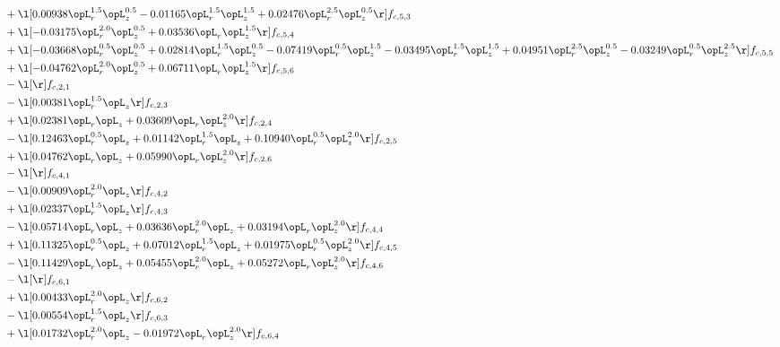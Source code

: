 \begin{alignat}{2}
& + \l[  0.00938 \opL_r^{1.5} \opL_z^{0.5}   -0.01165 \opL_r^{1.5} \opL_z^{1.5} +  0.02476 \opL_r^{2.5} \opL_z^{0.5}  \r] f_{c,5,3} \nonumber \\ 
& + \l[  -0.03175 \opL_r^{2.0} \opL_z^{0.5} +  0.03536 \opL_r \opL_z^{1.5}  \r] f_{c,5,4} \nonumber \\ 
& + \l[  -0.03668 \opL_r^{0.5} \opL_z^{0.5} +  0.02814 \opL_r^{1.5} \opL_z^{0.5}   -0.07419 \opL_r^{0.5} \opL_z^{1.5}   -0.03495 \opL_r^{1.5} \opL_z^{1.5} +  0.04951 \opL_r^{2.5} \opL_z^{0.5}   -0.03249 \opL_r^{0.5} \opL_z^{2.5}  \r] f_{c,5,5} \nonumber \\ 
& + \l[  -0.04762 \opL_r^{2.0} \opL_z^{0.5} +  0.06711 \opL_r \opL_z^{1.5}  \r] f_{c,5,6} \nonumber \\ 
& - \l[  \r] f_{c,2,1} \nonumber \\ 
& - \l[  0.00381 \opL_r^{1.5} \opL_z  \r] f_{c,2,3} \nonumber \\ 
& + \l[  0.02381 \opL_r \opL_z +  0.03609 \opL_r \opL_z^{2.0}  \r] f_{c,2,4} \nonumber \\ 
& - \l[  0.12463 \opL_r^{0.5} \opL_z +  0.01142 \opL_r^{1.5} \opL_z +  0.10940 \opL_r^{0.5} \opL_z^{2.0}  \r] f_{c,2,5} \nonumber \\ 
& + \l[  0.04762 \opL_r \opL_z +  0.05990 \opL_r \opL_z^{2.0}  \r] f_{c,2,6} \nonumber \\ 
& - \l[  \r] f_{c,4,1} \nonumber \\ 
& - \l[  0.00909 \opL_r^{2.0} \opL_z  \r] f_{c,4,2} \nonumber \\ 
& + \l[  0.02337 \opL_r^{1.5} \opL_z  \r] f_{c,4,3} \nonumber \\ 
& - \l[  0.05714 \opL_r \opL_z +  0.03636 \opL_r^{2.0} \opL_z +  0.03194 \opL_r \opL_z^{2.0}  \r] f_{c,4,4} \nonumber \\ 
& + \l[  0.11325 \opL_r^{0.5} \opL_z +  0.07012 \opL_r^{1.5} \opL_z +  0.01975 \opL_r^{0.5} \opL_z^{2.0}  \r] f_{c,4,5} \nonumber \\ 
& - \l[  0.11429 \opL_r \opL_z +  0.05455 \opL_r^{2.0} \opL_z +  0.05272 \opL_r \opL_z^{2.0}  \r] f_{c,4,6} \nonumber \\ 
& - \l[  \r] f_{c,6,1} \nonumber \\ 
& + \l[  0.00433 \opL_r^{2.0} \opL_z  \r] f_{c,6,2} \nonumber \\ 
& - \l[  0.00554 \opL_r^{1.5} \opL_z  \r] f_{c,6,3} \nonumber \\ 
& + \l[  0.01732 \opL_r^{2.0} \opL_z   -0.01972 \opL_r \opL_z^{2.0}  \r] f_{c,6,4} \nonumber \\ 

\end{alignat}
